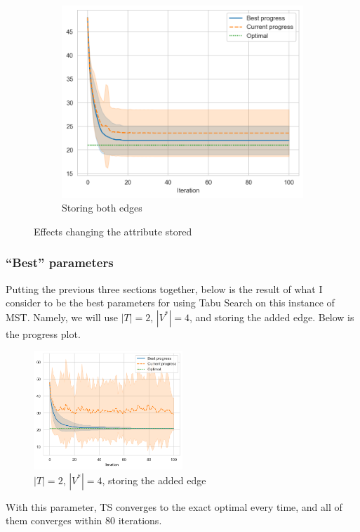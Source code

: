 \begin{figure}[ht]
\begin{subfigure}{0.45\textwidth}
        \centering
        \includegraphics[width=\textwidth]{../images/p1/both34s.png}
        \caption{Storing both edges}
    \end{subfigure}

    \caption{Effects changing the attribute stored}
    \label{fig:p1-change-attr}
\end{figure}

\subsubsection{``Best'' parameters}

Putting the previous three sections together, below is the result of what I consider to be the best parameters for using Tabu Search on this instance of MST. Namely, we will use \(|T| = 2\), \(|V^*| = 4\), and storing the added edge. Below is the progress plot.

\begin{figure}[ht]
    \centering
    \includegraphics[width=0.5\textwidth]{../images/p1/best.png}
    \caption{\(|T| = 2\), \(|V^*| = 4\), storing the added edge}
    \label{fig:p1-best}
\end{figure}

With this parameter, TS converges to the exact optimal every time, and all of them converges within 80 iterations.
